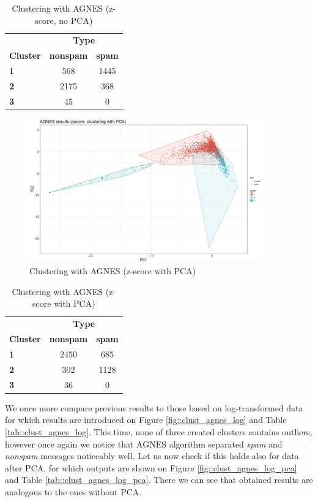 \documentclass{article}
\begin{document}
	\begin{table}[h]
		\centering
		\begin{tabular}{lcc}
			& \multicolumn{2}{c}{\textbf{Type}} \\
			\textbf{Cluster} & \textbf{nonspam} & \textbf{spam} \\
			\textbf{1} & 568 & 1445 \\
			\textbf{2} & 2175 & 368 \\
			\textbf{3} & 45 & 0 \\
		\end{tabular}
		\caption{Clustering with AGNES (z-score, no PCA)}
		\label{tab::clust_agnes_scaled}
	\end{table}
	
	\begin{figure}[h]
		\centering
		\includegraphics[width=0.9\textwidth]{proj2_plots/agnes_res_scaled_pca.png}
		\caption{Clustering with AGNES (z-score with PCA)}
		\label{fig::clust_agnes_scaled_pca}
	\end{figure}
	
	\begin{table}[h]
		\centering
		\begin{tabular}{lcc}
			& \multicolumn{2}{c}{\textbf{Type}} \\
			\textbf{Cluster} & \textbf{nonspam} & \textbf{spam} \\
			\textbf{1} & 2450 & 685 \\
			\textbf{2} & 302 & 1128 \\
			\textbf{3} & 36 & 0 \\
		\end{tabular}
		\caption{Clustering with AGNES (z-score with PCA)}
		\label{tab::clust_agnes_scaled_pca}
	\end{table}
	
	We once more compare previous results to those based on log-transformed data for which results are introduced on Figure \ref{fig::clust_agnes_log} and Table \ref{tab::clust_agnes_log}. This time, none of three created clusters contains outliers, however once again we notice that AGNES algorithm separated \textit{spam} and \textit{nonspam} messages noticeably well. Let us now check if this holds also for data after PCA, for which outputs are shown on Figure \ref{fig::clust_agnes_log_pca} and Table \ref{tab::clust_agnes_log_pca}. There we can see that obtained results are analogous to the ones without PCA.
	
\end{document}
